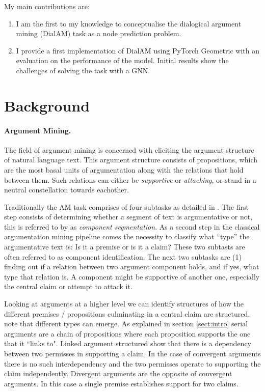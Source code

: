 \documentclass[11pt]{article}
\begin{document}
My main contributions are:
\begin{enumerate}
    \item I am the first to my knowledge to conceptualise the dialogical argument mining (DialAM) task as a node prediction problem.
    \item I provide a first implementation of DialAM using PyTorch Geometric with an evaluation on the performance of the model. Initial results show the challenges of solving the task with a GNN.
\end{enumerate}

\section{Background}
\label{sect:background}

\paragraph{Argument Mining.} The field of argument mining is concerned with eliciting the argument structure of natural language text. This argument structure consists of propositions, which are the most basal units of argumentation along with the relations that hold between them. Such relations can either be \textit{supportive} or \textit{attacking}, or stand in a neutral constellation towards eachother. 

Traditionally the AM task comprises of four subtasks as detailed in \citet{ye_end--end_2021}. The first step consists of determining whether a segment of text is argumentative or not, this is referred to by \citet{ye_end--end_2021} as \textit{component segmentation}. As a second step in the classical argumentation mining pipeline comes the necessity to classify what ``type'' the argumentative text is: Is it a premise or is it a claim? These two subtasts are often referred to as component identification. The next two subtasks are (1) finding out if a relation between two argument component holds, and if yes, what type that relation is. A component might be supportive of another one, especially the central claim or attempt to attack it.

Looking at arguments at a higher level we can identify structures of how the different premises / propositions culminating in a central claim are structured. \citet{stede_argumentation_2019} note that different types can emerge. As explained in section \ref{sect:intro} serial arguments are a chain of propositions where each proposition supports the one that it ``links to". Linked argument structured show that there is a dependency between two permisses in supporting a claim. In the case of convergent arguments there is no such interdependency and the two permisses operate to supporting the claim independently. Divergent arguments are the opposite of convergent arguments. In this case a single premise establishes support for two claims. 
\end{document}
